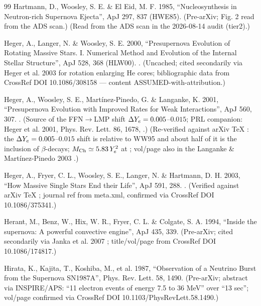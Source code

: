 \begin{thebibliography}{99}
Hartmann, D., Woosley, S. E. \& El Eid, M. F. 1985, ``Nucleosynthesis in Neutron-rich Supernova Ejecta'', ApJ 297, 837 (HWE85). (Pre-arXiv; Fig. 2 read from the ADS scan.) (Read from the ADS scan in the 2026-08-14 audit (tier2).)

Heger, A., Langer, N. \& Woosley, S. E. 2000, ``Presupernova Evolution of Rotating Massive Stars. I. Numerical Method and Evolution of the Internal Stellar Structure'', ApJ 528, 368 (HLW00). . (Uncached; cited secondarily via Heger et al. 2003  for rotation enlarging He cores; bibliographic data from CrossRef DOI 10.1086/308158 --- content ASSUMED-with-attribution.)

Heger, A., Woosley, S. E., Mart\'inez-Pinedo, G. \& Langanke, K. 2001, ``Presupernova Evolution with Improved Rates for Weak Interactions'', ApJ 560, 307. . (Source of the FFN$\to$LMP shift $\Delta Y_{e} = 0.005$--$0.015$; PRL companion: Heger et al. 2001, Phys. Rev. Lett. 86, 1678, .) (Re-verified against arXiv TeX : the $\Delta Y_{e} = 0.005$--$0.015$ shift is relative to WW95 and about half of it is the inclusion of $\beta$-decays; $M_{\mathrm{Ch}} \simeq 5.83\,Y_{e}^2$ at ; vol/page also in the Langanke \& Mart\'inez-Pinedo 2003 .)

Heger, A., Fryer, C. L., Woosley, S. E., Langer, N. \& Hartmann, D. H. 2003, ``How Massive Single Stars End their Life'', ApJ 591, 288. . (Verified against arXiv TeX ; journal ref from meta.xml, confirmed via CrossRef DOI 10.1086/375341.)

Herant, M., Benz, W., Hix, W. R., Fryer, C. L. \& Colgate, S. A. 1994, ``Inside the supernova: A powerful convective engine'', ApJ 435, 339. (Pre-arXiv; cited secondarily via Janka et al. 2007 ; title/vol/page from CrossRef DOI 10.1086/174817.)

Hirata, K., Kajita, T., Koshiba, M., et al. 1987, ``Observation of a Neutrino Burst from the Supernova SN1987A'', Phys. Rev. Lett. 58, 1490. (Pre-arXiv; abstract via INSPIRE/APS: ``11 electron events of energy 7.5 to 36 MeV'' over ``13 sec''; vol/page confirmed via CrossRef DOI 10.1103/PhysRevLett.58.1490.)


\end{thebibliography}
